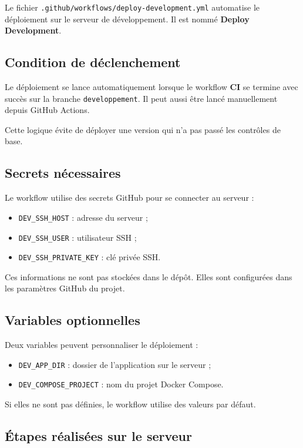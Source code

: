 \documentclass[11pt,a4paper]{article}
\begin{document}
Le fichier \texttt{.github/workflows/deploy-development.yml} automatise le
déploiement sur le serveur de développement. Il est nommé
\textbf{Deploy Development}.

\subsection{Condition de déclenchement}

Le déploiement se lance automatiquement lorsque le workflow \textbf{CI} se
termine avec succès sur la branche \texttt{developpement}. Il peut aussi être
lancé manuellement depuis GitHub Actions.

Cette logique évite de déployer une version qui n'a pas passé les contrôles de
base.

\subsection{Secrets nécessaires}

Le workflow utilise des secrets GitHub pour se connecter au serveur :

\begin{itemize}
  \item \texttt{DEV\_SSH\_HOST} : adresse du serveur ;
  \item \texttt{DEV\_SSH\_USER} : utilisateur SSH ;
  \item \texttt{DEV\_SSH\_PRIVATE\_KEY} : clé privée SSH.
\end{itemize}

Ces informations ne sont pas stockées dans le dépôt. Elles sont configurées dans
les paramètres GitHub du projet.

\subsection{Variables optionnelles}

Deux variables peuvent personnaliser le déploiement :

\begin{itemize}
  \item \texttt{DEV\_APP\_DIR} : dossier de l'application sur le serveur ;
  \item \texttt{DEV\_COMPOSE\_PROJECT} : nom du projet Docker Compose.
\end{itemize}

Si elles ne sont pas définies, le workflow utilise des valeurs par défaut.

\subsection{Étapes réalisées sur le serveur}
\end{document}
